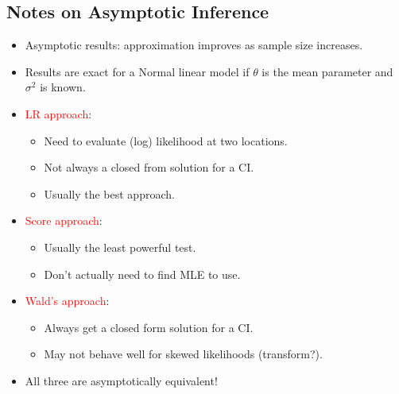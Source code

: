 \documentclass{article}\usepackage[]{graphicx}\usepackage[svgnames]{xcolor}
\begin{document}
\subsection*{Notes on Asymptotic Inference}
\begin{itemize}
      \item Asymptotic results: approximation improves as sample size increases.
      \item Results are exact for a Normal linear model if $ \theta $ is the mean parameter and $ \sigma^2 $ is
            known.
      \item \textcolor{Red}{LR approach}:
            \begin{itemize}
                  \item Need to evaluate (log) likelihood at two locations.
                  \item Not always a closed from solution for a CI.
                  \item Usually the best approach.
            \end{itemize}
      \item \textcolor{Red}{Score approach}:
            \begin{itemize}
                  \item Usually the least powerful test.
                  \item Don't actually need to find MLE to use.
            \end{itemize}
      \item \textcolor{Red}{Wald's approach}:
            \begin{itemize}
                  \item Always get a closed form solution for a CI.
                  \item May not behave well for skewed likelihoods (transform?).
            \end{itemize}
      \item All three are asymptotically equivalent!
\end{itemize}
\end{document}
